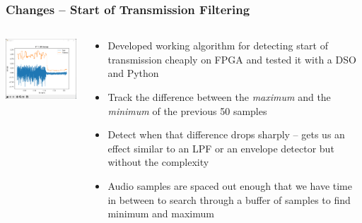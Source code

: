 \documentclass{beamer}
\begin{document}
    \begin{frame}
        \frametitle{Changes -- Start of Transmission Filtering}

        \begin{columns}
            \begin{column}{.5\textwidth}
                \centerline{\includegraphics[width=6cm]{ft3dr_keyup.png}}
            \end{column}
            \begin{column}{.5\textwidth}
                \begin{itemize}
                    \item<only@1> Developed working algorithm for detecting start of transmission cheaply on FPGA and tested it with a DSO and Python

                    \item<only@1> Track the difference between the \emph{maximum} and the \emph{minimum} of the previous 50 samples

                    \item<only@2> Detect when that difference drops sharply -- gets us an effect similar to an LPF or an envelope detector but without the complexity

                    \item<only@2> Audio samples are spaced out enough that we have time in between to search through a buffer of samples to find minimum and maximum
                \end{itemize}
            \end{column}
        \end{columns}
    \end{frame}
\end{document}
